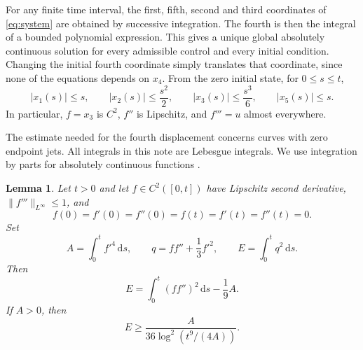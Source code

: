\documentclass[11pt,a4paper]{article}
\newtheorem{lemma}[theorem]{Lemma}
\newcommand{\dd}{\,\mathrm{d}}
\begin{document}
For any finite time interval, the first, fifth, second and third coordinates
of \eqref{eq:system} are obtained by successive integration. The fourth is
then the integral of a bounded polynomial expression. This gives a unique
global absolutely continuous solution for every admissible control and every
initial condition. Changing the initial fourth coordinate simply translates
that coordinate, since none of the equations depends on $x_4$.
From the zero initial state, for $0\le s\le t$,
\begin{equation}\label{eq:trajectory-bounds}
 |x_1(s)|\le s,\qquad |x_2(s)|\le\frac{s^2}{2},\qquad
 |x_3(s)|\le\frac{s^3}{6},\qquad |x_5(s)|\le s.
\end{equation}
In particular, $f=x_3$ is $C^2$, $f''$ is Lipschitz, and $f'''=u$ almost
everywhere.

The estimate needed for the fourth displacement concerns curves with zero
endpoint jets. All integrals in this note are Lebesgue integrals. We use
integration by parts for absolutely continuous functions
\cite[Appendix~3.A, Theorems~3.60 and~3.62]{Hunter}.

\begin{lemma}\label{lem:logarithmic}
Let $t>0$ and let $f\in C^2([0,t])$ have Lipschitz second derivative,
$\|f'''\|_{L^\infty}\le1$, and
\[
 f(0)=f'(0)=f''(0)=f(t)=f'(t)=f''(t)=0.
\]
Set
\[
 A=\int_0^t f'^4\dd s,\qquad
 q=ff''+\frac13f'^2,\qquad E=\int_0^t q^2\dd s.
\]
Then
\begin{equation}\label{eq:critical-identity}
 E=\int_0^t (ff'')^2\dd s-\frac19 A.
\end{equation}
If $A>0$, then
\begin{equation}\label{eq:logarithmic-estimate}
 E\ge\frac{A}{36\log^2(t^9/(4A))}.
\end{equation}
\end{lemma}
\end{document}
